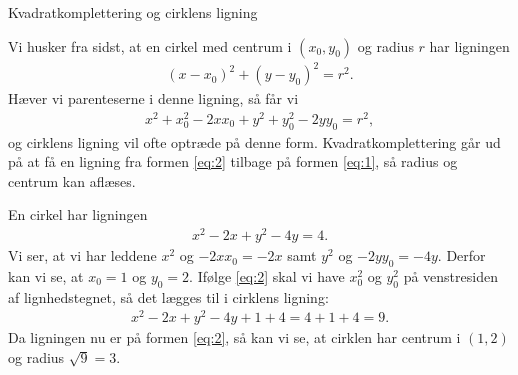 \begin{center}
\Huge
Kvadratkomplettering og cirklens ligning
\end{center}

Vi husker fra sidst, at en cirkel med centrum i $(x_0,y_0)$ og radius $r$ har ligningen
\begin{align}\label{eq:1}
	(x-x_0)^2 + (y-y_0)^2 = r^2.
\end{align}
Hæver vi parenteserne i denne ligning, så får vi
\begin{align}\label{eq:2}
	x^2+x_0^2-2xx_0 + y^2+y_0^2-2yy_0 = r^2,
\end{align}
og cirklens ligning vil ofte optræde på denne form. Kvadratkomplettering går ud på at få en ligning fra formen \eqref{eq:2} tilbage på formen \eqref{eq:1}, så radius og centrum kan aflæses.

\begin{exa}
	En cirkel har ligningen 
	\begin{align*}
		x^2-2x+y^2-4y=4.
	\end{align*}
	Vi ser, at vi har leddene $x^2$ og $-2xx_0 = -2x$ samt $y^2$ og $-2yy_0=-4y$. Derfor kan vi se, at $x_0 = 1$ og $y_0 = 2$. Ifølge \eqref{eq:2} skal vi have $x_0^2$
    og $y_0^2$ på venstresiden af lignhedstegnet, så det lægges til i cirklens ligning:
    \begin{align*}
    		x^2-2x+y^2-4y+1+4=4+1+4=9. 
    \end{align*}
   	Da ligningen nu er på formen \eqref{eq:2}, så kan vi se, at cirklen har centrum i $(1,2)$ og radius $\sqrt{9} = 3$.
\end{exa}

